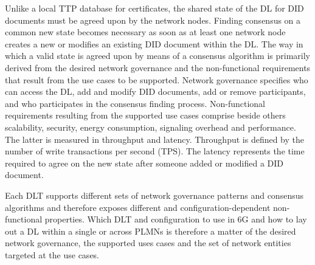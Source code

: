 \documentclass[conference]{IEEEtran}
\begin{document}
Unlike a local TTP database for certificates, the shared state of the DL for DID documents must be agreed upon by the network nodes. Finding consensus on a common new state becomes necessary as soon as at least one network node creates a new or modifies an existing DID document within the DL. The way in which a valid state is agreed upon by means of a consensus algorithm is primarily derived from the desired network governance and the non-functional requirements that result from the use cases to be supported. Network governance specifies who can access the DL, add and modify DID documents, add or remove participants, and  who participates in the consensus finding process. Non-functional requirements resulting from the supported use cases comprise beside others scalability, security, energy consumption, signaling overhead and performance. The latter is measured in throughput and latency. Throughput is defined by the number of write transactions per second (TPS). The latency represents the time required to agree on the new state after someone added or modified a DID document. 


Each DLT supports different sets of network governance patterns and consensus algorithms and therefore exposes different and configuration-dependent non-functional properties. Which DLT and configuration to use in 6G and how to lay out a DL within a single or across PLMNs is therefore a matter of the desired network governance, the supported uses cases and the set of network entities targeted at the use cases. %
\end{document}
